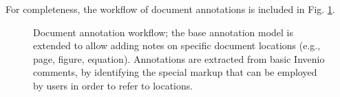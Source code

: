 For completeness, the workflow of document annotations is included in Fig.
\ref{fig:docanno}.

\begin{figure}[!ht]
  \centering
  \caption[Document annotation workflow]
          {Document annotation workflow; the base annotation model is extended
           to allow adding notes on specific document locations (e.g., page,
           figure, equation). Annotations are extracted from basic Invenio
           comments, by identifying the special markup that can be employed by
           users in order to refer to locations.}
  \label{fig:docanno}
\end{figure}

\FloatBarrier

